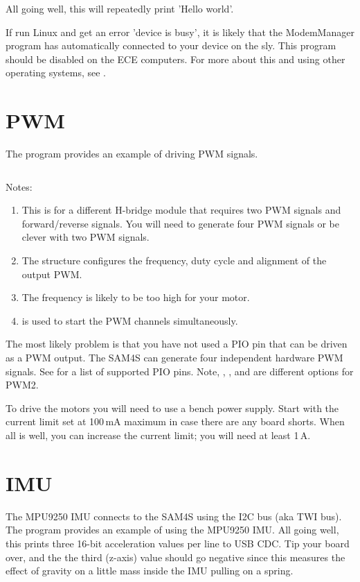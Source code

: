 All going well, this will repeatedly print 'Hello world'.

If run Linux and get an error 'device is busy', it is likely that the
ModemManager program has automatically connected to your device on the
sly. This program should be disabled on the ECE computers. For more
about this and using other operating systems, see .

\section{PWM}
\label{pwm-test}

The program  provides an
example of driving PWM signals.

\inputminted{C}{../../src/test-apps/pwm_test2/pwm_test2.c}

Notes:
%
\begin{enumerate}
\item
  This is for a different H-bridge module that requires two PWM signals
  and forward/reverse signals. You will need to generate four PWM
  signals or be clever with two PWM signals.
\item
  The  structure configures the frequency, duty
  cycle and alignment of the output PWM.
\item The frequency is likely to be too high for your motor.
\item {} is used to start the PWM channels simultaneously.  
\end{enumerate}

The most likely problem is that you have not used a PIO pin that can
be driven as a PWM output. The SAM4S can generate four independent
hardware PWM signals. See  for a list of
supported PIO pins. Note, , , and  are
different options for PWM2.

To drive the motors you will need to use a bench power supply. Start
with the current limit set at 100\,mA maximum in case there are any
board shorts.  When all is well, you can increase the current limit;
you will need at least 1\,A.

\section{IMU}
\label{imu-test}

The MPU9250 IMU connects to the SAM4S using the I2C bus (aka TWI bus).
The program  provides an
example of using the MPU9250 IMU.  All going well, this prints three
16-bit acceleration values per line to USB CDC. Tip your board over,
and the the third (z-axis) value should go negative since this
measures the effect of gravity on a little mass inside the IMU pulling
on a spring.

